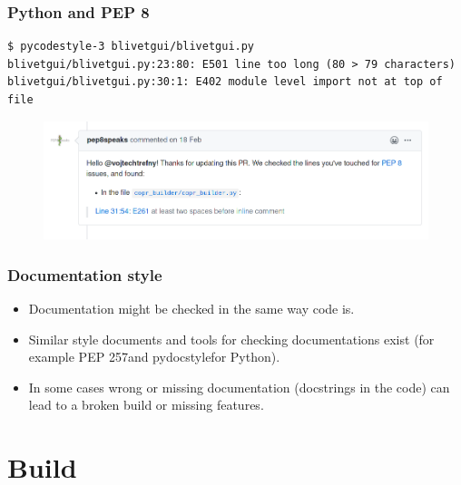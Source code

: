 \documentclass[aspectratio=169]{beamer}
\begin{document}
\begin{frame}[fragile]
	\frametitle{Python and PEP 8}

\begin{lstlisting}[frame=none, basicstyle=\ttfamily\small, columns=fullflexible, keepspaces=true]
$ pycodestyle-3 blivetgui/blivetgui.py 
blivetgui/blivetgui.py:23:80: E501 line too long (80 > 79 characters)
blivetgui/blivetgui.py:30:1: E402 module level import not at top of file
\end{lstlisting}

	\begin{figure}[ht!]
	\begin{center}
  	  \includegraphics[width=13cm]{img/pep8speaks.png}
	\end{center}
	\end{figure}
\end{frame}

\begin{frame}
	\frametitle{Documentation style}
	
	\begin{block}{}
		\begin{itemize}
			\item Documentation might be checked in the same way code is.
			\item Similar style documents and tools for checking documentations exist (for example PEP 257\footnotemark and pydocstyle\footnotemark for Python).
			\item In some cases wrong or missing documentation (docstrings in the code) can lead to a broken build or missing features.
		\end{itemize}
	\end{block}

\end{frame}

\section{Build}
\end{document}
